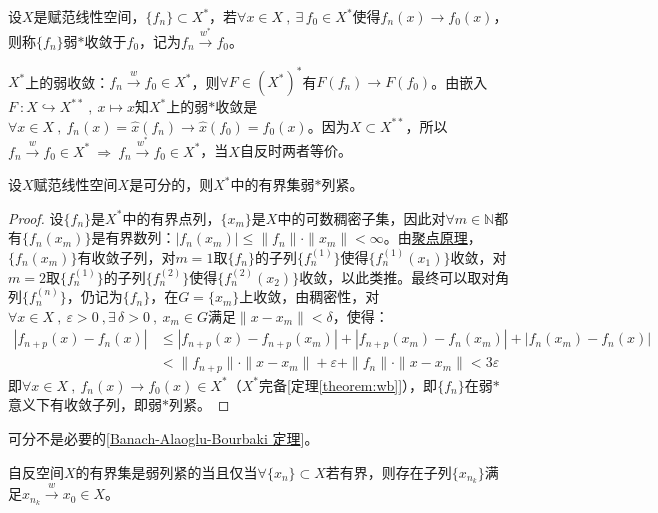 \begin{definition}[弱$*$收敛]
设$X$是赋范线性空间，$\{f_n\} \subset X^*$，若$\forall x \in X \ , \ \exists \, f_0 \in X^*$使得$f_n(x) \to f_0(x)$，则称$\{f_n\}$弱$*$收敛于$f_0$，记为$f_n \xrightarrow{w^*} f_0$。
\end{definition}
\begin{remark}
\quad $X^*$上的弱收敛：$f_n \xrightarrow{w} f_0 \in X^*$，则$\forall F \in (X^*)^*$有$F(f_n) \to F(f_0)$。由嵌入$F \ :X \hookrightarrow X^{**} \ , \ x \mapsto \hat{x}$知$X^*$上的弱$*$收敛是$\forall x \in X \ , \ f_n(x)=\hat{x}(f_n) \to \hat{x}(f_0)=f_0(x)$。因为$X \subset X^{**}$，所以$f_n \xrightarrow{w} f_0 \in X^* \ \Rightarrow \ f_n \xrightarrow{w^*} f_0  \in X^*$，当$X$自反时两者等价。
\end{remark}

\begin{theorem}\label{theorem:kfrxlj}
设$X$赋范线性空间$X$是可分的，则$X^*$中的有界集弱$*$列紧。
\end{theorem}
\begin{proof}
设$\{f_n\}$是$X^*$中的有界点列，$\{x_m\}$是$X$中的可数稠密子集，因此对$\forall m \in \mathbb{N}$都有$\{f_n(x_m)\}$是有界数列：$|f_n(x_m)|\leq\|f_n\|\cdot\|x_m\|<\infty$。由\href{https://math.fandom.com/zh/wiki/Bolzano-Weierstrass_%E5%AE%9A%E7%90%86}{聚点原理}，$\{f_n(x_m)\}$有收敛子列，对$m=1$取$\{f_n\}$的子列$\{f_n^{(1)}\}$使得$\{f_n^{(1)}(x_1)\}$收敛，对$m=2$取$\{f_n^{(1)}\}$的子列$\{f_n^{(2)}\}$使得$\{f_n^{(2)}(x_2)\}$收敛，以此类推。最终可以取对角列$\{f_n^{(n)}\}$，仍记为$\{f_n\}$，在$G=\{x_m\}$上收敛，由稠密性，对$\forall x \in X \ , \ \varepsilon>0 \ , \exists \, \delta>0 \ , \ x_m \in G$满足$\|x-x_m\|<\delta$，使得：
\[\begin{aligned}
|f_{n+p}(x)-f_n(x)|&\leq|f_{n+p}(x)-f_{n+p}(x_m)|+|f_{n+p}(x_m)-f_n(x_m)|+|f_n(x_m)-f_n(x)|\\
&<\|f_{n+p}\|\cdot\|x-x_m\|+\varepsilon+\|f_n\|\cdot\|x-x_m\|<3\varepsilon
\end{aligned}\]
即$\forall x \in X \ , \ f_n(x) \to f_0(x) \in X^*$（$X^*$完备[定理\ref{theorem:wb}]），即$\{f_n\}$在弱$*$意义下有收敛子列，即弱$*$列紧。
\end{proof}
\begin{remark}
\quad 可分不是必要的[\href{https://math.fandom.com/zh/wiki/Banach-Alaoglu-Bourbaki_%E5%AE%9A%E7%90%86}{Banach-Alaoglu-Bourbaki 定理}]。
\end{remark}
\begin{theorem}\label{theorem:zfyjrlj}
自反空间$X$的有界集是弱列紧的当且仅当$\forall \{x_n\} \subset X$若有界，则存在子列$\{x_{n_k}\}$满足$x_{n_k} \xrightarrow{w} x_0 \in X$。
\end{theorem}
